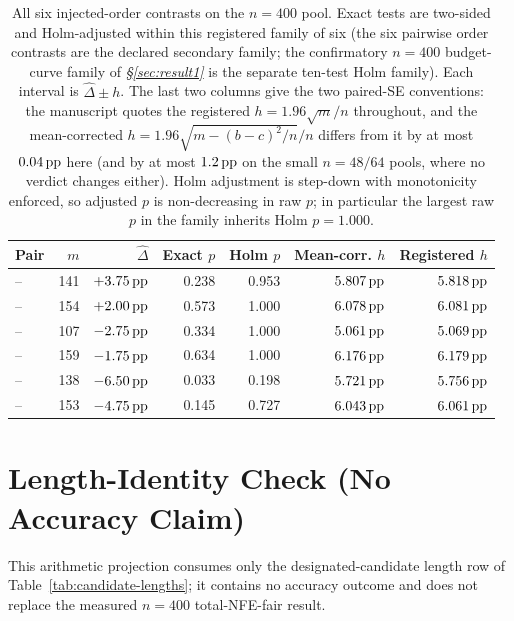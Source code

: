 \begin{table}[H]
\centering
\small
\setlength{\tabcolsep}{4pt}
\caption{All six injected-order contrasts on the $n=400$ pool.  Exact tests
are two-sided and Holm-adjusted within this registered family of six
(the six pairwise order contrasts are the declared secondary family; the
confirmatory $n{=}400$ budget-curve family of \emph{\S\ref{sec:result1}} is
the separate ten-test Holm family).  Each
interval is $\widehat\Delta\pm h$.  The last two columns give the two paired-SE
conventions: the manuscript quotes the registered $h=1.96\sqrt{m}/n$
throughout, and the mean-corrected $h=1.96\sqrt{m-(b-c)^2/n}/n$ differs from it
by at most $0.04\,\mathrm{pp}$ here (and by at most $1.2\,\mathrm{pp}$ on the small $n=48/64$
pools, where no verdict changes either).
Holm adjustment is step-down with monotonicity enforced, so adjusted $p$ is
non-decreasing in raw $p$; in particular the largest raw $p$ in the family
inherits Holm $p=1.000$.}
\label{tab:order-six-ci}
\begin{tabular}{@{}lrrrrrr@{}}
\toprule
Pair & $m$ & $\widehat\Delta$ & Exact $p$ & Holm $p$ & Mean-corr. $h$ & Registered $h$ \\
\midrule
\sconf{}--\rinj{} & 141 & $+3.75\,\mathrm{pp}$ & 0.238 & 0.953 & $5.807\,\mathrm{pp}$ & $5.818\,\mathrm{pp}$ \\
\sconf{}--\ainj{} & 154 & $+2.00\,\mathrm{pp}$ & 0.573 & 1.000 & $6.078\,\mathrm{pp}$ & $6.081\,\mathrm{pp}$ \\
\sconf{}--\finj{} & 107 & $-2.75\,\mathrm{pp}$ & 0.334 & 1.000 & $5.061\,\mathrm{pp}$ & $5.069\,\mathrm{pp}$ \\
\rinj{}--\ainj{} & 159 & $-1.75\,\mathrm{pp}$ & 0.634 & 1.000 & $6.176\,\mathrm{pp}$ & $6.179\,\mathrm{pp}$ \\
\rinj{}--\finj{} & 138 & $-6.50\,\mathrm{pp}$ & 0.033 & 0.198 & $5.721\,\mathrm{pp}$ & $5.756\,\mathrm{pp}$ \\
\ainj{}--\finj{} & 153 & $-4.75\,\mathrm{pp}$ & 0.145 & 0.727 & $6.043\,\mathrm{pp}$ & $6.061\,\mathrm{pp}$ \\
\bottomrule
\end{tabular}
\end{table}

\section{Length-Identity Check (No Accuracy Claim)}
\label{app:projestimator}

This arithmetic projection consumes only the designated-candidate length row
of Table~\ref{tab:candidate-lengths}; it contains no accuracy outcome and does
not replace the measured $n{=}400$ total-NFE-fair result.

